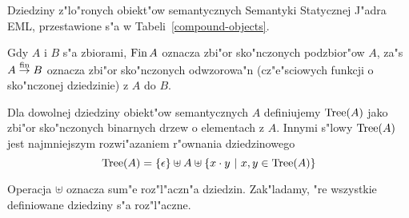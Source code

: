 Dziedziny z"lo"ronych obiekt"ow semantycznych Semantyki Statycznej J"a\-dra EML,
przestawione s"a w Tabeli~\ref{compound-objects}.

Gdy $A$ i $B$ s"a zbiorami, $\mathop{\rm Fin}\nolimits A$ oznacza zbi"or sko"nczonych podzbior"ow $A$,
za"s $A\stackrel{{\rm fin}}{\to}B$ oznacza zbi"or sko"nczonych odwzorowa"n
(cz"e"sciowych funkcji o sko"nczonej dziedzinie) z $A$ do $B$.

Dla dowolnej dziedziny obiekt"ow semantycznych $A$ definiujemy
$\mbox{Tree}(A)$ jako zbi"or sko"nczonych binarnych drzew o elementach z $A$.
Innymi s"lowy $\mbox{Tree}(A)$ jest najmniejszym rozwi"azaniem r"ownania dziedzinowego
$$
\mbox{Tree}(A) = \{\epsilon\}\uplus
A\uplus\{x\cdot y~|~x,y\in \mbox{Tree}(A)\}
$$

Operacja $\uplus$ oznacza sum"e roz"l"aczn"a dziedzin.
Zak"ladamy, "re wszystkie definiowane dziedziny s"a roz"l"aczne.


